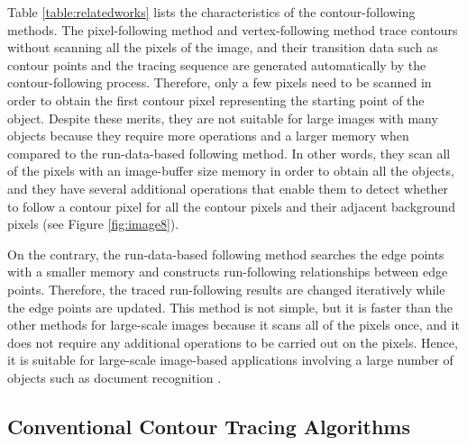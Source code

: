 Table \ref{table:relatedworks} lists the characteristics of the contour-following methods. The pixel-following method and vertex-following method trace contours without scanning all the pixels of the image, and their transition data such as contour points and the tracing sequence are generated automatically by the contour-following process. Therefore, only a few pixels need to be scanned in order to obtain the first contour pixel representing the starting point of the object. Despite these merits, they are not suitable for large images with many objects because they require more operations and a larger memory when compared to the run-data-based following method. In other words, they scan all of the pixels with an image-buffer size memory in order to obtain all the objects, and they have several additional operations that enable them to detect whether to follow a contour pixel for all the contour pixels and their adjacent background pixels (see Figure \ref{fig:image8}). 


On the contrary, the run-data-based following method searches the edge points with a smaller memory and constructs run-following relationships between edge points. Therefore, the traced run-following results are changed iteratively while the edge points are updated. This method is not simple, but it is faster than the other methods for large-scale images because it scans all of the pixels once, and it does not require any additional operations to be carried out on the pixels. Hence, it is suitable for large-scale image-based applications involving a large number of objects such as document recognition \cite{Miyatake1997Contour}.


\subsection{Conventional Contour Tracing Algorithms}

